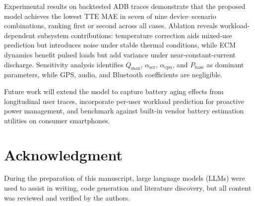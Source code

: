 \documentclass[conference]{IEEEtran}
\begin{document}
Experimental results on backtested ADB traces demonstrate that the proposed model achieves the lowest TTE MAE in seven of nine device--scenario combinations, ranking first or second across all cases. Ablation reveals workload-dependent subsystem contributions: temperature correction aids mixed-use prediction but introduces noise under stable thermal conditions, while ECM dynamics benefit pulsed loads but add variance under near-constant-current discharge. Sensitivity analysis identifies $Q_{\max}$, $\alpha_{\mathrm{scr}}$, $\alpha_{\mathrm{cpu}}$, and $P_{\mathrm{base}}$ as dominant parameters, while GPS, audio, and Bluetooth coefficients are negligible.

Future work will extend the model to capture battery aging effects from longitudinal user traces, incorporate per-user workload prediction for proactive power management, and benchmark against built-in vendor battery estimation utilities on consumer smartphones.





\section*{Acknowledgment}

During the preparation of this manuscript, large language models (LLMs) were used to assist in writing, code generation and literature discovery, but all content was reviewed and verified by the authors.






\end{document}
